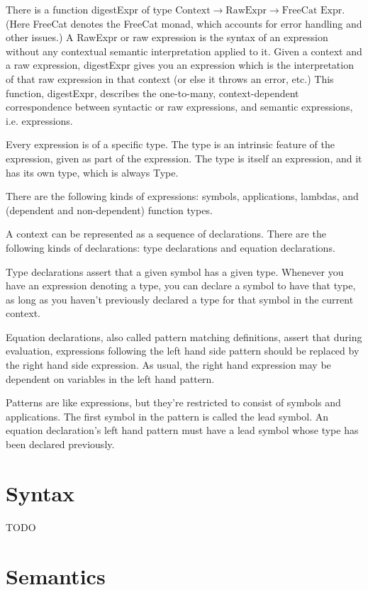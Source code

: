 \documentclass{article}
\begin{document}
There is a function digestExpr of type $\text{Context} \to \text{RawExpr} \to \text{FreeCat Expr}$. (Here FreeCat denotes the FreeCat monad, which accounts for error handling and other issues.) A RawExpr or raw expression is the syntax of an expression without any contextual semantic interpretation applied to it. Given a context and a raw expression, digestExpr gives you an expression which is the interpretation of that raw expression in that context (or else it throws an error, etc.) This function, digestExpr, describes the one-to-many, context-dependent correspondence between syntactic or raw expressions, and semantic expressions, i.e. expressions.

Every expression is of a specific type. The type is an intrinsic feature of the expression, given as part of the expression. The type is itself an expression, and it has its own type, which is always Type.

There are the following kinds of expressions: symbols, applications, lambdas, and (dependent and non-dependent) function types.

A context can be represented as a sequence of declarations. There are the following kinds of declarations: type declarations and equation declarations.

Type declarations assert that a given symbol has a given type. Whenever you have an expression denoting a type, you can declare a symbol to have that type, as long as you haven't previously declared a type for that symbol in the current context.

Equation declarations, also called pattern matching definitions, assert that during evaluation, expressions following the left hand side pattern should be replaced by the right hand side expression. As usual, the right hand expression may be dependent on variables in the left hand pattern.

Patterns are like expressions, but they're restricted to consist of symbols and applications. The first symbol in the pattern is called the lead symbol. An equation declaration's left hand pattern must have a lead symbol whose type has been declared previously.

\section{Syntax}

TODO

\section{Semantics}
\end{document}
